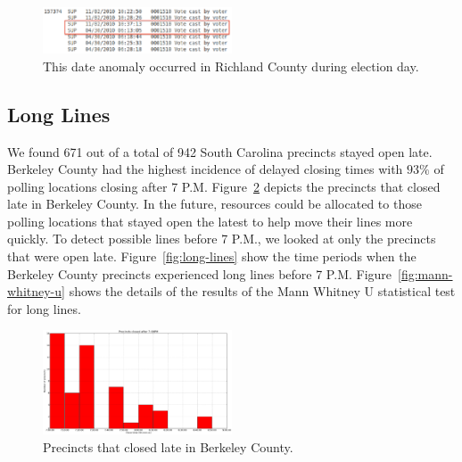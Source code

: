 \documentclass[letterpaper,twocolumn,10pt]{article}
\begin{document}
\begin{figure}[htbp]
\begin{center}
    \includegraphics[width=0.5\textwidth,height=0.1\textheight]{DateAnomaly.eps}
\end{center}
\caption{This date anomaly occurred in Richland County during election day.}
\label{fig:date-anomaly}
\end{figure}

\subsection{Long Lines}
We found 671 out of a total of 942 South Carolina precincts stayed open
late. Berkeley County had the highest incidence of delayed closing times with
$93\%$ of polling locations closing after 7
P.M\@. Figure~\ref{fig:precincts-closed-late} depicts the precincts 
that closed late in Berkeley County. In the future, resources could be allocated
to those polling locations that stayed open the latest to help move their lines
more quickly. To detect possible lines before 7 P.M., we looked at only the
precincts that were open late. Figure~\ref{fig:long-lines} show the time periods
when the Berkeley County precincts experienced long lines before 7
P.M. Figure~\ref{fig:mann-whitney-u} shows the details of the results of the
Mann Whitney U statistical test for long lines.

\begin{figure}[htbp]
\begin{center}
    \includegraphics[width=0.5\textwidth,height=0.3\textheight]{berkeleyopenlate.eps}
\end{center}
\caption{Precincts that closed late in Berkeley County.}
\label{fig:precincts-closed-late}
\end{figure}
\end{document}
